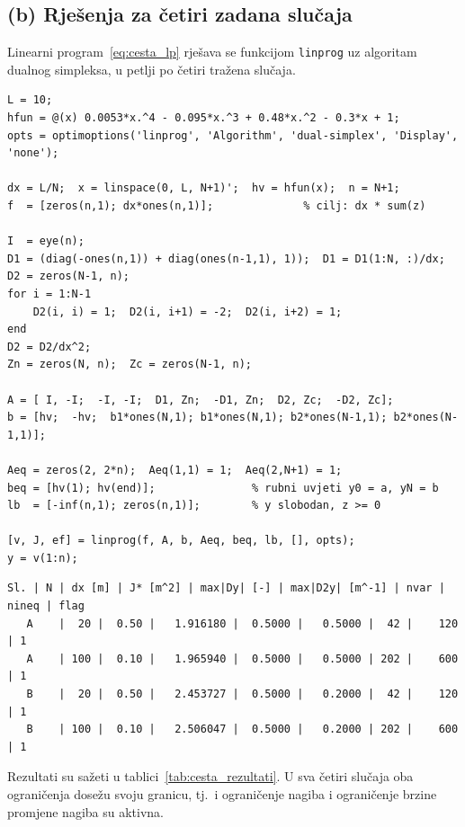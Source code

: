 \subsection{(b) Rješenja za četiri zadana slučaja}

Linearni program~\eqref{eq:cesta_lp} rješava se funkcijom \texttt{linprog} uz algoritam dualnog simpleksa, u petlji po četiri tražena slučaja.

\begin{lstlisting}
L = 10;
hfun = @(x) 0.0053*x.^4 - 0.095*x.^3 + 0.48*x.^2 - 0.3*x + 1;
opts = optimoptions('linprog', 'Algorithm', 'dual-simplex', 'Display', 'none');

dx = L/N;  x = linspace(0, L, N+1)';  hv = hfun(x);  n = N+1;
f  = [zeros(n,1); dx*ones(n,1)];              % cilj: dx * sum(z)

I  = eye(n);
D1 = (diag(-ones(n,1)) + diag(ones(n-1,1), 1));  D1 = D1(1:N, :)/dx;
D2 = zeros(N-1, n);
for i = 1:N-1
    D2(i, i) = 1;  D2(i, i+1) = -2;  D2(i, i+2) = 1;
end
D2 = D2/dx^2;
Zn = zeros(N, n);  Zc = zeros(N-1, n);

A = [ I, -I;  -I, -I;  D1, Zn;  -D1, Zn;  D2, Zc;  -D2, Zc];
b = [hv;  -hv;  b1*ones(N,1); b1*ones(N,1); b2*ones(N-1,1); b2*ones(N-1,1)];

Aeq = zeros(2, 2*n);  Aeq(1,1) = 1;  Aeq(2,N+1) = 1;
beq = [hv(1); hv(end)];               % rubni uvjeti y0 = a, yN = b
lb  = [-inf(n,1); zeros(n,1)];        % y slobodan, z >= 0

[v, J, ef] = linprog(f, A, b, Aeq, beq, lb, [], opts);
y = v(1:n);
\end{lstlisting}

\begin{lstlisting}[style=outputstyle]
 Sl. | N | dx [m] | J* [m^2] | max|Dy| [-] | max|D2y| [m^-1] | nvar | nineq | flag
   A    |  20 |  0.50 |   1.916180 |  0.5000 |   0.5000 |  42 |    120 | 1
   A    | 100 |  0.10 |   1.965940 |  0.5000 |   0.5000 | 202 |    600 | 1
   B    |  20 |  0.50 |   2.453727 |  0.5000 |   0.2000 |  42 |    120 | 1
   B    | 100 |  0.10 |   2.506047 |  0.5000 |   0.2000 | 202 |    600 | 1
\end{lstlisting}

Rezultati su sažeti u tablici~\ref{tab:cesta_rezultati}. U sva četiri slučaja oba ograničenja dosežu svoju granicu, tj.\ i ograničenje nagiba i ograničenje brzine promjene nagiba su aktivna.

